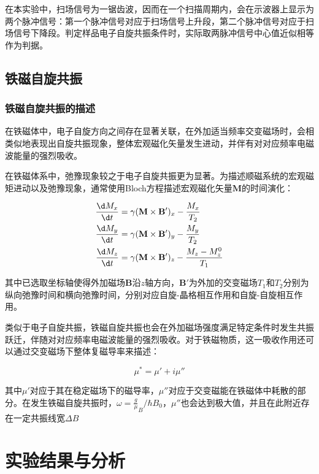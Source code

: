 \documentclass{thuemp}
\begin{document}
在本实验中，扫场信号为一锯齿波，因而在一个扫描周期内，会在示波器上显示为两个脉冲信号：第一个脉冲信号对应于扫场信号上升段，第二个脉冲信号对应于扫场信号下降段。判定样品电子自旋共振条件时，实际取两脉冲信号中心值近似相等作为判据。

\subsection{铁磁自旋共振}

\subsubsection{铁磁自旋共振的描述}

在铁磁体中，电子自旋方向之间存在显著关联，在外加适当频率交变磁场时，会相类似地表现出自旋共振现象，整体宏观磁化矢量发生进动，并伴有对对应频率电磁波能量的强烈吸收。

在铁磁体系中，弛豫现象较之于电子自旋共振更为显著。为描述顺磁系统的宏观磁矩进动以及弛豫现象，通常使用Bloch方程描述宏观磁化矢量$\mathbf{M}$的时间演化：

\begin{equation}
\begin{align}
    \frac{\d M_x}{\d t} &= \gamma (\mathbf{M} \times \mathbf{B'})_x - \frac{M_x}{T_2} \\
    \frac{\d M_y}{\d t} &= \gamma (\mathbf{M} \times \mathbf{B'})_y - \frac{M_y}{T_2} \\
    \frac{\d M_z}{\d t} &= \gamma (\mathbf{M} \times \mathbf{B'})_z - \frac{M_z - M_z^0}{T_1}
\end{align}
\end{equation}

其中已选取坐标轴使得外加磁场$\mathbf{B}$沿$z$轴方向，$\mathbf{B'}$为外加的交变磁场$T_1$和$T_2$分别为纵向弛豫时间和横向弛豫时间，分别对应自旋-晶格相互作用和自旋-自旋相互作用。

类似于电子自旋共振，铁磁自旋共振也会在外加磁场强度满足特定条件时发生共振跃迁，伴随对对应频率电磁波能量的强烈吸收。对于铁磁物质，这一吸收作用还可以通过交变磁场下整体复磁导率来描述：

\begin{equation}
    \mu^* = \mu' + i\mu''
\end{equation}

其中$\mu'$对应于其在稳定磁场下的磁导率，$\mu''$对应于交变磁能在铁磁体中耗散的部分。在发生铁磁自旋共振时，$\omega = \frac{g}\mu_B/\hbar B_0$，$\mu''$也会达到极大值，并且在此附近存在一定共振线宽$\Delta B$

\section{实验结果与分析}
\end{document}
